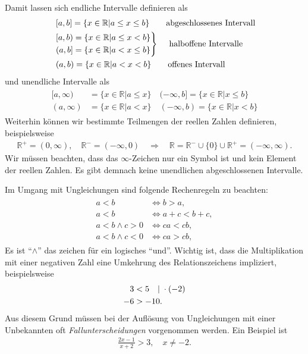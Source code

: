 Damit lassen sich endliche Intervalle definieren als 
\begin{align}
    \begin{split}
        &\;[a,b] = \{x \in\mathbb{R} | a \le x \le b\} \qquad \text{abgeschlossenes Intervall} \\
        &\begin{rcases}
            [a,b) = \{x \in\mathbb{R} | a \le x < b\} \\
            (a,b] = \{x \in\mathbb{R} | a < x \le b\}   
        \end{rcases} \quad\;\text{halboffene Intervalle} \\
        &\;(a,b) = \{x \in\mathbb{R} | a < x < b\} \qquad \text{offenes Intervall} \\
    \end{split}
\end{align}
und unendliche Intervalle als 
\begin{align}
    \begin{split}
        [a,\infty) &= \{x\in\mathbb{R}| a \le x\} \quad (\minus\infty,b] = \{x\in\mathbb{R}| x \le b\}\\
        (a,\infty) &= \{x\in\mathbb{R}| a < x\} \quad (\minus\infty,b) = \{x\in\mathbb{R}| x < b\}
    \end{split}
\end{align}
Weiterhin können wir bestimmte Teilmengen der reellen Zahlen definieren, beispielsweise 
\begin{align}
    \mathbb{R}^+ = (0,\infty), \quad \mathbb{R}^- = (\minus\infty,0) \quad \Rightarrow \quad \mathbb{R} = \mathbb{R}^- \cup \{0\} \cup \mathbb{R}^+ = (\minus\infty,\infty).
\end{align}
Wir müssen beachten, dass das $\infty$-Zeichen nur ein Symbol ist und kein Element der reellen Zahlen. Es gibt demnach keine unendlichen abgeschlossenen Intervalle.

Im Umgang mit Ungleichungen sind folgende Rechenregeln zu beachten: 
\begin{align}
    \begin{split}
        a < b &\Longleftrightarrow b>a, \\
        a < b &\Longleftrightarrow a+c < b+c,\\
        a < b \wedge c > 0 &\Longleftrightarrow ca < cb, \\
        a < b \wedge c < 0 &\Longleftrightarrow ca > cb, 
    \end{split}
\end{align}
Es ist ``$\wedge$'' das zeichen für ein logisches ``und''. Wichtig ist, dass die Multiplikation mit einer negativen Zahl eine Umkehrung des Relationszeichens impliziert, beispielsweise 
\begin{align}
    3 &< 5 \quad |\; \cdot (-2) \notag \\
    -6 &> -10. 
\end{align}
Aus diesem Grund müssen bei der Auflösung von Ungleichungen mit einer Unbekannten oft \emph{Fallunterscheidungen} vorgenommen werden. Ein Beispiel ist 
\begin{align}
    \frac{2x-1}{x+2} > 3, \quad x\neq -2.
\end{align}

